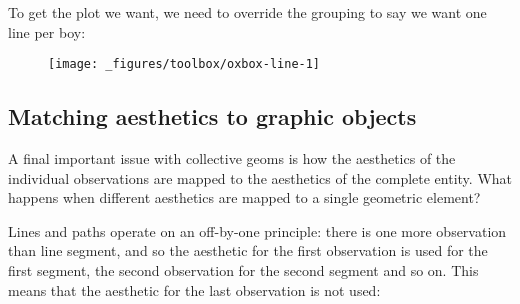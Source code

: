 To get the plot we want, we need to override the grouping to say we want
one line per boy:

\begin{Shaded}
\begin{Highlighting}[]
\OperatorTok{+}\StringTok{ }
\StringTok{  }\NormalTok{() }\OperatorTok{+}
\StringTok{  }\NormalTok{(}\NormalTok{(} \NormalTok{, } \NormalTok{)}
\end{Highlighting}
\end{Shaded}

\begin{figure}[H]
  \centering
  \texttt{[image: \_figures/toolbox/oxbox-line-1]}
\end{figure}

\hypertarget{sub:matching}{%
\subsection{Matching aesthetics to graphic objects}\label{sub:matching}}

A final important issue with collective geoms is how the aesthetics of
the individual observations are mapped to the aesthetics of the complete
entity. What happens when different aesthetics are mapped to a single
geometric element? 

Lines and paths operate on an off-by-one principle: there is one more
observation than line segment, and so the aesthetic for the first
observation is used for the first segment, the second observation for
the second segment and so on. This means that the aesthetic for the last
observation is not used:

